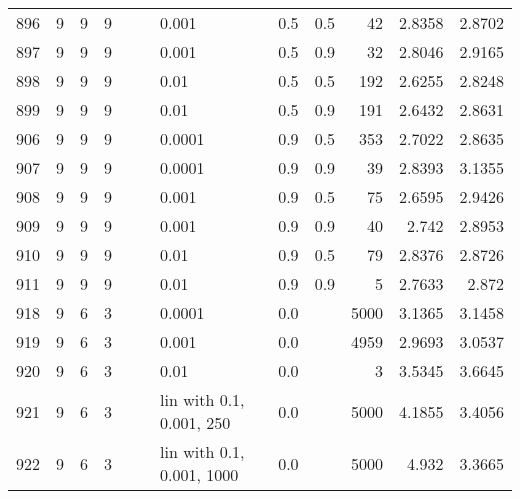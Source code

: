 \begin{longtable}{lrrrrrlrrrrr}
  896 &       9 & 9 & 9 &   &   &                       0.001 &      0.5 &    0.5 &      42 &                 2.8358 &                 2.8702 \\
  897 &       9 & 9 & 9 &   &   &                       0.001 &      0.5 &    0.9 &      32 &                 2.8046 &                 2.9165 \\
  898 &       9 & 9 & 9 &   &   &                        0.01 &      0.5 &    0.5 &     192 &                 2.6255 &                 2.8248 \\
  899 &       9 & 9 & 9 &   &   &                        0.01 &      0.5 &    0.9 &     191 &                 2.6432 &                 2.8631 \\
  906 &       9 & 9 & 9 &   &   &                      0.0001 &      0.9 &    0.5 &     353 &                 2.7022 &                 2.8635 \\
  907 &       9 & 9 & 9 &   &   &                      0.0001 &      0.9 &    0.9 &      39 &                 2.8393 &                 3.1355 \\
  908 &       9 & 9 & 9 &   &   &                       0.001 &      0.9 &    0.5 &      75 &                 2.6595 &                 2.9426 \\
  909 &       9 & 9 & 9 &   &   &                       0.001 &      0.9 &    0.9 &      40 &                  2.742 &                 2.8953 \\
  910 &       9 & 9 & 9 &   &   &                        0.01 &      0.9 &    0.5 &      79 &                 2.8376 &                 2.8726 \\
  911 &       9 & 9 & 9 &   &   &                        0.01 &      0.9 &    0.9 &       5 &                 2.7633 &                  2.872 \\
  918 &       9 & 6 & 3 &   &   &                      0.0001 &      0.0 &        &    5000 &                 3.1365 &                 3.1458 \\
  919 &       9 & 6 & 3 &   &   &                       0.001 &      0.0 &        &    4959 &                 2.9693 &                 3.0537 \\
  920 &       9 & 6 & 3 &   &   &                        0.01 &      0.0 &        &       3 &                 3.5345 &                 3.6645 \\
  921 &       9 & 6 & 3 &   &   &    lin with 0.1, 0.001, 250 &      0.0 &        &    5000 &                 4.1855 &                 3.4056 \\
  922 &       9 & 6 & 3 &   &   &   lin with 0.1, 0.001, 1000 &      0.0 &        &    5000 &                  4.932 &                 3.3665 \\

\end{longtable}
